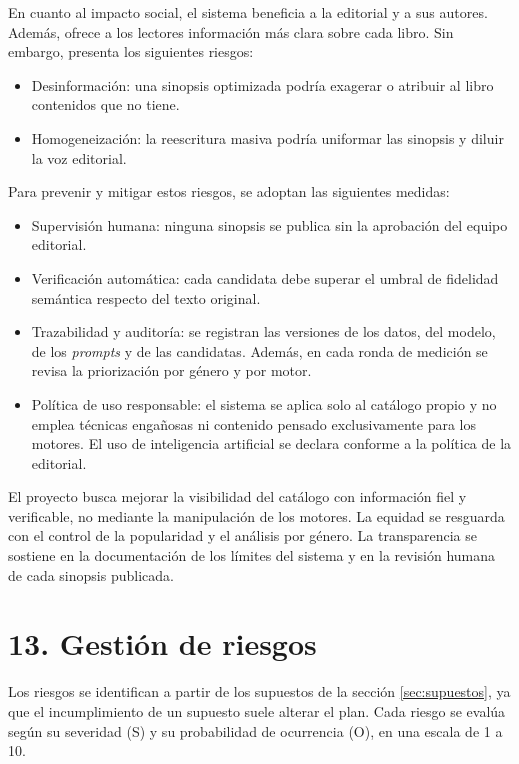 \documentclass[
11pt, %
codirector, %
]{charter}
\begin{document}
En cuanto al impacto social, el sistema beneficia a la editorial y a sus autores. Además, ofrece a los lectores información más clara sobre cada libro. Sin embargo, presenta los siguientes riesgos:

\begin{itemize}
	\item Desinformación: una sinopsis optimizada podría exagerar o atribuir al libro contenidos que no tiene.
	\item Homogeneización: la reescritura masiva podría uniformar las sinopsis y diluir la voz editorial.
\end{itemize}

Para prevenir y mitigar estos riesgos, se adoptan las siguientes medidas:

\begin{itemize}
	\item Supervisión humana: ninguna sinopsis se publica sin la aprobación del equipo editorial.
	\item Verificación automática: cada candidata debe superar el umbral de fidelidad semántica respecto del texto original.
	\item Trazabilidad y auditoría: se registran las versiones de los datos, del modelo, de los \textit{prompts} y de las candidatas. Además, en cada ronda de medición se revisa la priorización por género y por motor.
	\item Política de uso responsable: el sistema se aplica solo al catálogo propio y no emplea técnicas engañosas ni contenido pensado exclusivamente para los motores. El uso de inteligencia artificial se declara conforme a la política de la editorial.
\end{itemize}

El proyecto busca mejorar la visibilidad del catálogo con información fiel y verificable, no mediante la manipulación de los motores. La equidad se resguarda con el control de la popularidad y el análisis por género. La transparencia se sostiene en la documentación de los límites del sistema y en la revisión humana de cada sinopsis publicada.


\section{13. Gestión de riesgos}
\label{sec:riesgos}

Los riesgos se identifican a partir de los supuestos de la sección \ref{sec:supuestos}, ya que el incumplimiento de un supuesto suele alterar el plan. Cada riesgo se evalúa según su severidad (S) y su probabilidad de ocurrencia (O), en una escala de 1 a 10.
\end{document}
